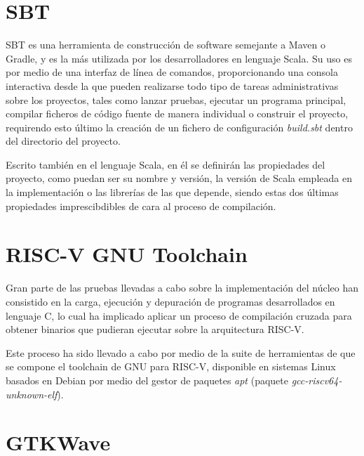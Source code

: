 
\section{SBT}

SBT es una herramienta de construcción de software semejante a Maven o Gradle, y es la más utilizada por los desarrolladores en lenguaje Scala\cite{scalaSurvey}. Su uso es por medio de una interfaz de línea de comandos, proporcionando una consola interactiva desde la que pueden realizarse todo tipo de tareas administrativas sobre los proyectos, tales como lanzar pruebas, ejecutar un programa principal, compilar ficheros de código fuente de manera individual o construir el proyecto, requirendo esto último la creación de un fichero de configuración \textit{build.sbt} dentro del directorio del proyecto.

Escrito también en el lenguaje Scala, en él se definirán las propiedades del proyecto, como puedan ser su nombre y versión, la versión de Scala empleada en la implementación o las librerías de las que depende, siendo estas dos últimas propiedades imprescibdibles de cara al proceso de compilación.

\section{RISC-V GNU Toolchain}

Gran parte de las pruebas llevadas a cabo sobre la implementación del núcleo han consistido en la carga, ejecución y depuración de programas desarrollados en lenguaje C, lo cual ha implicado aplicar un proceso de compilación cruzada para obtener binarios que pudieran ejecutar sobre la arquitectura RISC-V.

Este proceso ha sido llevado a cabo por medio de la suite de herramientas de que se compone el toolchain de GNU para RISC-V\cite{riscvtoolchain}, disponible en sistemas Linux basados en Debian por medio del gestor de paquetes \textit{apt} (paquete \textit{gcc-riscv64-unknown-elf}).

\section{GTKWave}

